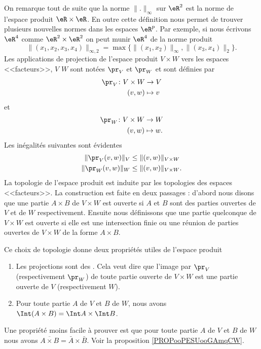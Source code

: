 On remarque tout de suite que la norme \( \|.\|_\infty\) sur \( \eR^2\) est la norme de l'espace produit \( \eR\times\eR\). En outre cette définition nous permet de trouver plusieurs nouvelles normes dans les espaces \( \eR^p\). Par exemple, si nous écrivons \( \eR^4\) comme \( \eR^2\times \eR^2\) on peut munir \( \eR^4\) de la norme produit
\[
	\|(x_1,x_2,x_3,x_4)\|_{\infty, 2}=\max\{\|(x_1,x_2)\|_\infty, \|(x_3,x_4)\|_2\}.
\]
Les applications de projection de l'espace produit \( V\times W\) vers les espaces <<facteurs>>, \( V\) \( W\) sont notées \( \pr_V\) et \( \pr_W\) et sont définies par
\begin{equation}
	\begin{aligned}
		\pr_V\colon V\times W & \to V     \\
		(v,w)                 & \mapsto v
	\end{aligned}
\end{equation}
et
\begin{equation}
	\begin{aligned}
		\pr_W\colon V\times W & \to W      \\
		(v,w)                 & \mapsto w.
	\end{aligned}
\end{equation}
Les inégalités suivantes sont évidentes
\begin{equation}
	\begin{aligned}[]
		\|\pr_V(v,w)\|_V & \leq \|(v,w)\|_{V\times W}  \\
		\|\pr_W(v,w)\|_W & \leq \|(v,w)\|_{V\times W}.
	\end{aligned}
\end{equation}
La topologie de l'espace produit est induite par les topologies des espaces <<facteurs>>. La construction est faite en deux passages : d'abord nous disons que une partie \( A\times B\) de \( V\times W\) est ouverte si \( A\) et \( B\) sont des parties ouvertes de \( V\) et de \( W\) respectivement.  Ensuite nous définissons que une partie quelconque de \( V\times W\) est ouverte si elle est une intersection finie ou une réunion de parties ouvertes de \( V\times W\) de la forme \( A\times B\).

Ce choix de topologie donne deux propriétés utiles de l'espace produit
\begin{enumerate}
	\item
	      Les projections sont des . Cela veut dire que l'image par \( \pr_V\) (respectivement \( \pr_W\)) de toute partie ouverte de \( V\times W\) est une partie ouverte de \( V\) (respectivement \( W\)).
	\item
	      Pour toute partie \( A\) de \( V\) et \( B\) de \( W\), nous avons \( \Int (A\times B)=\Int A\times \Int B\).\label{PgovlABeqbAbB}
\end{enumerate}
Une propriété moins facile à prouver est que pour toute partie \( A\) de \( V\) et \( B\) de \( W\) nous avons  \( \overline{A\times B}=\bar{A}\times \bar{B}\). Voir la proposition \ref{PROPooPESUooGAmqCW}.


